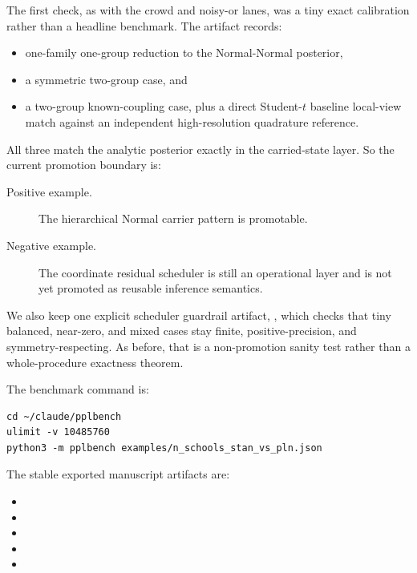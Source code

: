 \documentclass[11pt,openany]{report}
\begin{document}
The first check, as with the crowd and noisy-or lanes, was a tiny exact
calibration rather than a headline benchmark.  The artifact
 records:
\begin{itemize}
\item one-family one-group reduction to the Normal-Normal posterior,
\item a symmetric two-group case, and
\item a two-group known-coupling case, plus a direct Student-$t$ baseline
local-view match against an independent high-resolution quadrature reference.
\end{itemize}
All three match the analytic posterior exactly in the carried-state layer.
So the current promotion boundary is:
\begin{description}
\item[Positive example.] The hierarchical Normal carrier pattern is promotable.
\item[Negative example.] The coordinate residual scheduler is still an
operational layer and is not yet promoted as reusable inference semantics.
\end{description}

We also keep one explicit scheduler guardrail artifact,
, which checks
that tiny balanced, near-zero, and mixed cases stay finite, positive-precision,
and symmetry-respecting.  As before, that is a non-promotion sanity test rather
than a whole-procedure exactness theorem.

The benchmark command is:
\begin{lstlisting}
cd ~/claude/pplbench
ulimit -v 10485760
python3 -m pplbench examples/n_schools_stan_vs_pln.json
\end{lstlisting}

The stable exported manuscript artifacts are:
\begin{itemize}
\item {}
\item {}
\item {}
\item {}
\item {}
\end{itemize}
\end{document}
